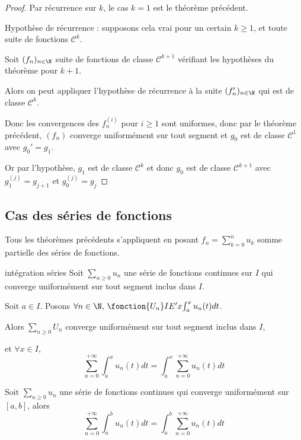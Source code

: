 
\begin{proof}
    Par récurrence sur $k$, le cas $k = 1$ est le théorème précédent.

    Hypothèse de récurrence : supposons cela vrai pour un certain $k \geqslant 1$, et toute 
    suite de fonctions $\mathscr C^k$. 

    Soit $(f_n)_{n \in \N}$ suite de fonctions de classe $\mathscr{C}^{k + 1}$ vérifiant les hypothèses du théorème pour $k + 1$.

    Alors on peut appliquer l'hypothèse de récurrence à la suite $(f_n')_{n \in \N}$ qui est de classe $\mathscr{C}^k$.

    Donc les convergences des $f_n^{(i)}$ pour $i \geqslant 1$ sont uniformes, donc 
    par le théorème précédent, $(f_n)$ converge uniformément sur tout segment et 
    $g_0$ est de classe $\mathscr{C}^1$ avec $g_0' = g_1$. 

    Or par l'hypothèse, $g_1$ est de classe $\mathscr{C}^k$ et donc $g_0$ est de classe $\mathscr{C}^{k + 1}$ avec
    $g_1^{(j)} = g_{j + 1}$ et $g_0^{(j)} = g_j$ 
\end{proof}

\subsection{Cas des séries de fonctions }

Tous les théorèmes précédents s'appliquent en posant $\displaystyle f_n = \sum_{k = 0}^n u_k$ somme partielle des 
séries de fonctions.

\begin{theoreme}{intégration séries}{}
    Soit $\sum_{n \geqslant 0} u_n$ une série de fonctions continues sur $I$ qui converge uniformément 
    sur tout segment inclus dans $I$.

    Soit $a \in I$. Posons $\forall n \in \N, \, \fonction{U_n} I {E'}{x}{\int_a^x u_n(t) dt}$.

    Alors $\sum_{n \geqslant 0} U_n$ converge uniformément sur tout segment inclus dans $I$, 
    
    et 
    $\forall x \in I$, 
    $$\sum_{n = 0 }^{+ \infty } \int_{a }^{x } u_n(t) dt = \int_{a}^{x } \sum_{n = 0}^{+ \infty} u_n(t) dt$$
\end{theoreme}

\begin{corollaire}{}{}
    Soit $\sum_{n \geqslant 0} u_n$ une série de fonctions continues qui converge uniformément sur 
    $[a, b]$, alors 
    $$\sum_{n = 0}^{+ \infty} \int_{a}^{b} u_n(t) dt = \int_{a}^{b} \sum_{n = 0}^{+ \infty} u_n(t) dt$$
\end{corollaire}


